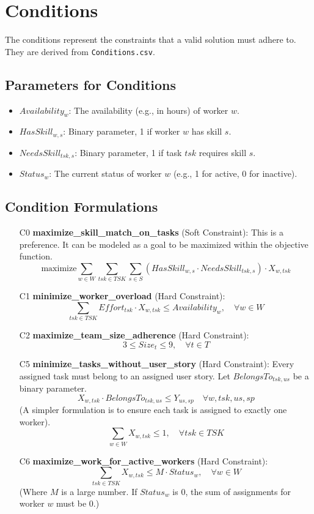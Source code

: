 \documentclass[11pt]{article}
\begin{document}
\section{Conditions}
The conditions represent the constraints that a valid solution must adhere to. They are derived from \texttt{Conditions.csv}.

\subsection*{Parameters for Conditions}
\begin{itemize}
    \item $Availability_w$: The availability (e.g., in hours) of worker $w$.
    \item $HasSkill_{w,s}$: Binary parameter, 1 if worker $w$ has skill $s$.
    \item $NeedsSkill_{tsk,s}$: Binary parameter, 1 if task $tsk$ requires skill $s$.
    \item $Status_w$: The current status of worker $w$ (e.g., 1 for active, 0 for inactive).
\end{itemize}

\subsection*{Condition Formulations}
\begin{itemize}
    \item [C0] \textbf{maximize\_skill\_match\_on\_tasks} (Soft Constraint): This is a preference. It can be modeled as a goal to be maximized within the objective function.
    $$ \text{maximize} \sum_{w \in W} \sum_{tsk \in TSK} \sum_{s \in S} (HasSkill_{w,s} \cdot NeedsSkill_{tsk,s}) \cdot X_{w, tsk} $$

    \item [C1] \textbf{minimize\_worker\_overload} (Hard Constraint):
    $$ \sum_{tsk \in TSK} Effort_{tsk} \cdot X_{w, tsk} \leq Availability_w, \quad \forall w \in W $$

    \item [C2] \textbf{maximize\_team\_size\_adherence} (Hard Constraint):
    $$ 3 \leq Size_t \leq 9, \quad \forall t \in T $$

    \item [C5] \textbf{minimize\_tasks\_without\_user\_story} (Hard Constraint): Every assigned task must belong to an assigned user story. Let $BelongsTo_{tsk,us}$ be a binary parameter.
    $$ X_{w,tsk} \cdot BelongsTo_{tsk,us} \leq Y_{us,sp} \quad \forall w, tsk, us, sp $$
    (A simpler formulation is to ensure each task is assigned to exactly one worker).
    $$ \sum_{w \in W} X_{w, tsk} \leq 1, \quad \forall tsk \in TSK $$

    \item [C6] \textbf{maximize\_work\_for\_active\_workers} (Hard Constraint):
    $$ \sum_{tsk \in TSK} X_{w, tsk} \leq M \cdot Status_w, \quad \forall w \in W $$
    (Where $M$ is a large number. If $Status_w$ is 0, the sum of assignments for worker $w$ must be 0.)

\end{itemize}
\end{document}
